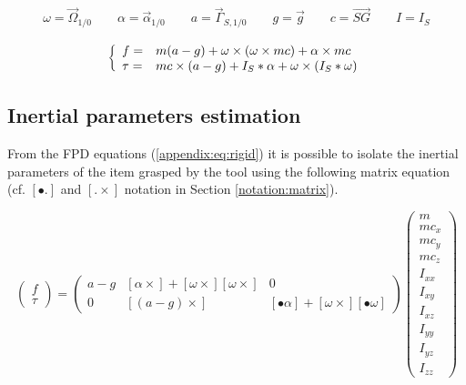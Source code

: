 \documentclass[\main/main.tex]{subfiles}
\begin{document}
\begin{align*}
 \omega = \overrightarrow{\Omega}_{1/0} \qquad \alpha = \overrightarrow{\alpha}_{1/0} \qquad a = \overrightarrow{\Gamma}_{S, 1/0} \qquad g = \overrightarrow{g} \qquad c  = \overrightarrow{SG} \qquad I = I_{S}
\end{align*}

\begin{equation}
 \label{appendix:eq:rigid}
 \left \{
 \begin{array}{l l}
  f =    & m (a - g) + \omega \times (\omega \times m c) + \alpha \times m c \\
  \tau = & m c \times (a - g)
  + I_{S} \ast \alpha + \omega \times (I_{S} \ast \omega)
 \end{array}
 \right.
\end{equation}

\subsection{Inertial parameters estimation}
\label{appendix:rigid:inertia_estimation}

From the \ac{FPD} equations (\ref{appendix:eq:rigid}) it is possible to isolate the inertial parameters of the item grasped by the tool using the following matrix equation (cf. $\left[ \bullet . \right]$ and $\left[. \times \right]$ notation in Section \ref{notation:matrix}).

\begin{equation}
  \label{eq:appendix:rigid}
 \begin{pmatrix}
  f    \\
  \tau
 \end{pmatrix}
 =
 \begin{pmatrix}
  a - g & \left[ \alpha \times \right] +  \left[ \omega \times \right] \left[ \omega \times \right] & 0                                                                                                             \\
  0     & \left[ (a - g) \times \right]                                                                                & \left[ \bullet \alpha \right] + \left[ \omega \times \right] \left[ \bullet \omega \right]
 \end{pmatrix}
 \begin{pmatrix}
  m      \\
  m c_x  \\
  m c_y  \\
  m c_z  \\
  I_{xx} \\
  I_{xy} \\
  I_{xz} \\
  I_{yy} \\
  I_{yz} \\
  I_{zz}
 \end{pmatrix}
\end{equation}
\end{document}
